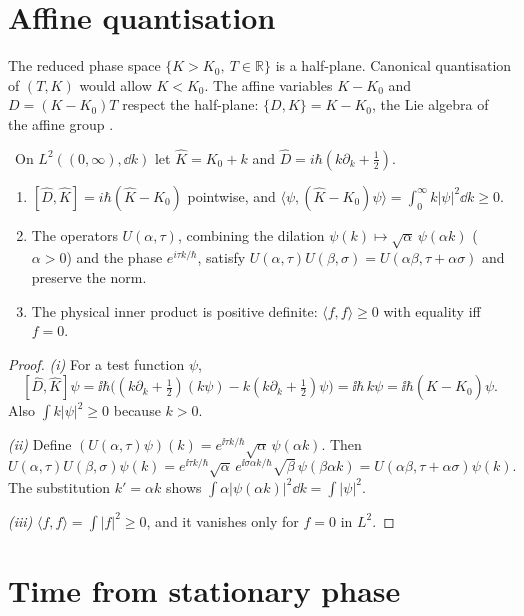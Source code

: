 \section{Affine quantisation}

The reduced phase space $\{K>K_0,\ T\in\mathbb R\}$ is a half-plane. Canonical quantisation of $(T,K)$ would allow $K<K_0$. The affine variables $K-K_0$ and $D=(K-K_0)T$ respect the half-plane: $\{D,K\}=K-K_0$, the Lie algebra of the affine group \cite{Klauder2012}.

\begin{theorem}\label{thm:affine}\ver\
On $L^2((0,\infty),\dd k)$ let $\hat K=K_0+k$ and $\hat D=i\hbar(k\partial_k+\frac12)$.
\begin{enumerate}[label=(\roman*)]
\item $[\hat D,\hat K]=i\hbar(\hat K-K_0)$ pointwise, and $\langle\psi,(\hat K-K_0)\psi\rangle=\int_0^\infty k|\psi|^2\dd k\ge0$.
\item The operators $U(\alpha,\tau)$, combining the dilation $\psi(k)\mapsto\sqrt\alpha\,\psi(\alpha k)$ ($\alpha>0$) and the phase $e^{i\tau k/\hbar}$, satisfy $U(\alpha,\tau)U(\beta,\sigma)=U(\alpha\beta,\tau+\alpha\sigma)$ and preserve the norm.
\item The physical inner product is positive definite: $\langle f,f\rangle\ge0$ with equality iff $f=0$.
\end{enumerate}
\end{theorem}
\begin{proof}
\emph{(i)} For a test function $\psi$,
\[
[\hat D,\hat K]\psi=\ii\hbar\bigl((k\partial_k+\tfrac12)(k\psi)-k(k\partial_k+\tfrac12)\psi\bigr)=\ii\hbar\,k\psi=\ii\hbar(\hat K-K_0)\psi .
\]
Also $\int k|\psi|^2\ge0$ because $k>0$.

\emph{(ii)} Define $(U(\alpha,\tau)\psi)(k)=e^{\ii\tau k/\hbar}\sqrt\alpha\,\psi(\alpha k)$. Then
\[
U(\alpha,\tau)U(\beta,\sigma)\psi(k)=e^{\ii\tau k/\hbar}\sqrt\alpha\,e^{\ii\sigma\alpha k/\hbar}\sqrt\beta\,\psi(\beta\alpha k)=U(\alpha\beta,\tau+\alpha\sigma)\psi(k).
\]
The substitution $k'=\alpha k$ shows $\int\alpha|\psi(\alpha k)|^2\dd k=\int|\psi|^2$.

\emph{(iii)} $\langle f,f\rangle=\int|f|^2\ge0$, and it vanishes only for $f=0$ in $L^2$.
\end{proof}


\section{Time from stationary phase}

